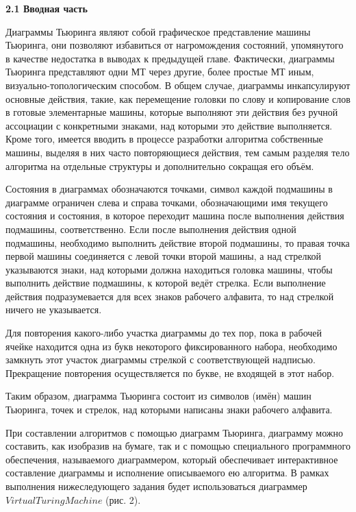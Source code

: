 \documentclass{article}
\begin{document}
\par \textbf{2.1 Вводная часть}\\
\par Диаграммы Тьюринга являют собой графическое представление машины Тьюринга, они позволяют избавиться от нагромождения состояний, упомянутого в качестве недостатка в выводах к предыдущей главе. Фактически, диаграммы Тьюринга представляют одни МТ через другие, более простые МТ иным, визуально-топологическим способом. В общем случае, диаграммы инкапсулируют основные действия, такие, как перемещение головки по слову и копирование слов в готовые элементарные машины, которые выполняют эти действия без ручной ассоциации с конкретными знаками, над которыми это действие выполняется. Кроме того, имеется вводить в процессе разработки алгоритма собственные машины, выделяя в них часто повторяющиеся действия, тем самым разделяя тело алгоритма на отдельные структуры и дополнительно сокращая его объём.\\
\par Состояния в диаграммах обозначаются точками, символ каждой подмашины в диаграмме ограничен слева и справа точками, обозначающими имя текущего состояния и состояния, в которое переходит машина после выполнения действия подмашины, соответственно. Если после выполнения действия одной подмашины, необходимо выполнить действие второй подмашины, то правая точка первой машины соединяется с левой точки второй машины, а над стрелкой указываются знаки, над которыми должна находиться головка машины, чтобы выполнить действие подмашины, к которой ведёт стрелка. Если выполнение действия подразумевается для всех знаков рабочего алфавита, то над стрелкой ничего не указывается.\\

\par Для повторения какого-либо участка диаграммы до тех пор, пока в рабочей ячейке находится одна из букв некоторого фиксированного набора, необходимо замкнуть этот участок диаграммы стрелкой с соответствующей надписью. Прекращение повторения осуществляется по букве, не входящей в этот набор.\\

\par Таким образом, диаграмма Тьюринга состоит из символов (имён) машин Тьюринга, точек и стрелок, над которыми написаны знаки рабочего алфавита.\\

\par При составлении алгоритмов с помощью диаграмм Тьюринга, диаграмму можно составить, как изобразив на бумаге, так и с помощью специального программного обеспечения, называемого диаграммером, который обеспечивает интерактивное составление диаграммы и исполнение описываемого ею алгоритма. В рамках выполнения нижеследующего задания будет использоваться диаграммер $Virtual Turing Machine$ (рис. 2).
\end{document}
